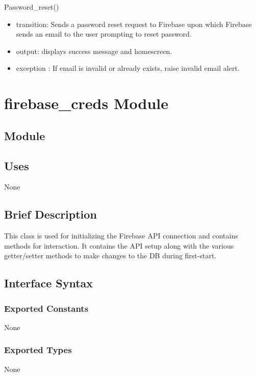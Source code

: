 \documentclass[12pt, titlepage]{article}
\begin{document}
Password\_reset()
\begin{itemize}
    \item transition: Sends a password reset request to Firebase upon which Firebase sends an email to the user prompting to reset password.
    \item output: displays success message and homescreen.
    \item exception : If email is invalid or already exists, raise invalid email alert.
\end{itemize}








\section* {firebase\_creds Module}

\subsection*{Module}

\subsection* {Uses}
None

\subsection* {Brief Description}
This class is used for initializing the Firebase API connection and contains methods for interaction. It contains the API setup along with the various getter/setter methods to make changes to the DB during first-start.

\subsection* {Interface Syntax}
\subsubsection* {Exported Constants}
None

\subsubsection* {Exported Types}
None
\end{document}
